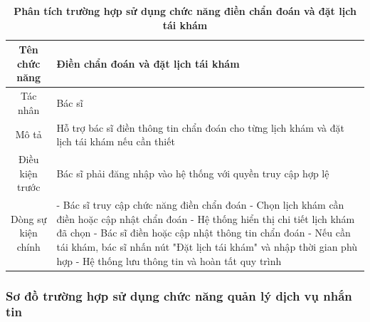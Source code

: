 \begin{table}[H]
	\caption{\bfseries \fontsize{12pt}{0pt}\selectfont Phân tích trường hợp sử dụng chức năng điền chẩn đoán và đặt lịch tái khám}
	\centering
	\begin{tabularx}{0.9\textwidth}{|c|X|}
		\hline
		\textbf{Tên chức năng} & \textbf{Điền chẩn đoán và đặt lịch tái khám}                                                 \\
		\hline
		Tác nhân               & Bác sĩ                                                                                       \\
		\hline
		Mô tả                  & Hỗ trợ bác sĩ điền thông tin chẩn đoán cho từng lịch khám và đặt lịch tái khám nếu cần thiết \\
		\hline
		Điều kiện trước        & Bác sĩ phải đăng nhập vào hệ thống với quyền truy cập hợp lệ                                 \\
		\hline
		Dòng sự kiện chính     &
		- Bác sĩ truy cập chức năng điền chẩn đoán \newline
		- Chọn lịch khám cần điền hoặc cập nhật chẩn đoán \newline
		- Hệ thống hiển thị chi tiết lịch khám đã chọn \newline
		- Bác sĩ điền hoặc cập nhật thông tin chẩn đoán \newline
		- Nếu cần tái khám, bác sĩ nhấn nút "Đặt lịch tái khám" và nhập thời gian phù hợp \newline
		- Hệ thống lưu thông tin và hoàn tất quy trình                                                                        \\
		\hline
	\end{tabularx}
\end{table}

\subsubsection{Sơ đồ trường hợp sử dụng chức năng quản lý dịch vụ nhắn tin}

